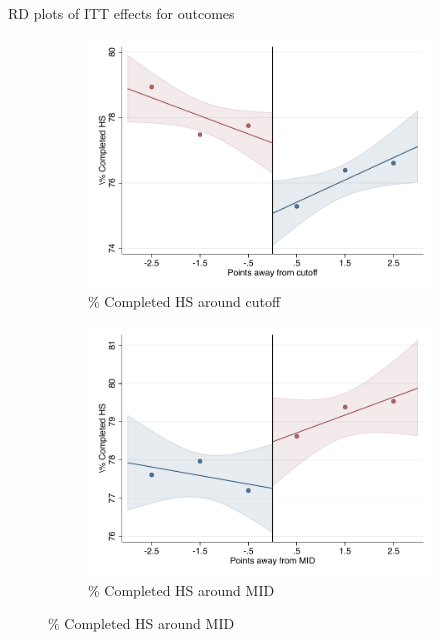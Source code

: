 \documentclass[notes,11pt, aspectratio=169]{beamer}
\begin{document}
\begin{frame}{RD plots of ITT effects for outcomes}
\hyperlink{ITT_rd_plot_IPN}{}
\begin{figure}

    \begin{subfigure}{0.45\textwidth}
        \centering
        \caption{\% Completed HS around cutoff}
        \includegraphics[width=\textwidth]{04_Figures/rd_plot_tau_bachillerato_mas_IPN3.pdf}
    \end{subfigure}
    \begin{subfigure}{0.45\textwidth}
        \centering
        \caption{\% Completed HS around MID}
        \includegraphics[width=\textwidth]{04_Figures/rd_plot_mid_bachillerato_mas_IPN3.pdf}
    \end{subfigure}
    
\end{figure}
\end{frame}
\end{document}
